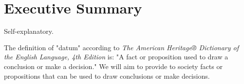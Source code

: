 \section{Executive Summary}
Self-explanatory.

The definition of "datum" according to \emph{The American Heritage® Dictionary of the English Language, 4th Edition} is: "A fact or proposition used to draw a conclusion or make a decision." We will aim to provide to society facts or propositions that can be used to draw conclusions or make decisions.